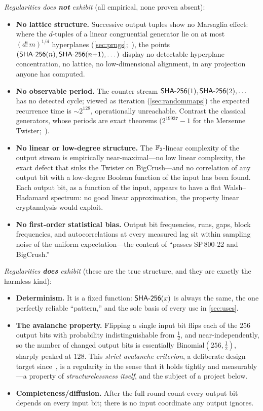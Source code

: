 \emph{Regularities \SHA{} does \textbf{not} exhibit} (all empirical, none
proven absent):
\begin{itemize}
  \item \textbf{No lattice structure.} Successive output tuples show no
  Marsaglia effect: where the $d$-tuples of a linear congruential
  generator lie on at most $(d!\,m)^{1/d}$ hyperplanes
  (\cref{sec:prngs};~\citealp{Marsaglia1968}), the points
  $(\textsf{SHA-256}(n), \textsf{SHA-256}(n{+}1), \dots)$ display no detectable hyperplane
  concentration, no lattice, no low-dimensional alignment, in any
  projection anyone has computed.
  \item \textbf{No observable period.} The counter stream $\textsf{SHA-256}(1),
  \textsf{SHA-256}(2), \dots$ has no detected cycle; viewed as iteration
  (\cref{sec:randommaps}) the expected recurrence time is $\sim 2^{128}$,
  operationally unreachable. Contrast the classical generators, whose
  periods are exact theorems ($2^{19937}-1$ for the Mersenne
  Twister;~\citealp{MatsumotoNishimura1998}).
  \item \textbf{No linear or low-degree structure.} The $\mathbb{F}_2$-linear
  complexity of the output stream is empirically near-maximal---no low
  linear complexity, the exact defect that sinks the Twister on
  BigCrush---and no correlation of any output bit with a
  low-degree Boolean function of the input has been found. Each output
  bit, as a function of the input, appears to have a flat
  Walsh--Hadamard spectrum: no good linear approximation, the property
  linear cryptanalysis would exploit.
  \item \textbf{No first-order statistical bias.} Output bit frequencies,
  runs, gaps, block frequencies, and autocorrelations at every measured
  lag sit within sampling noise of the uniform expectation---the content
  of ``passes SP\,800-22 and BigCrush.''
\end{itemize}

\emph{Regularities \SHA{} \textbf{does} exhibit} (these are the true
structure, and they are exactly the harmless kind):
\begin{itemize}
  \item \textbf{Determinism.} It is a fixed function: $\textsf{SHA-256}(x)$ is always
  the same, the one perfectly reliable ``pattern,'' and the sole basis of
  every use in \cref{sec:uses}.
  \item \textbf{The avalanche property.} Flipping a single input bit
  flips each of the $256$ output bits with probability indistinguishable
  from $\tfrac12$, and near-independently, so the number of changed
  output bits is essentially $\mathrm{Binomial}(256, \tfrac12)$, sharply
  peaked at $128$. This \emph{strict avalanche criterion}, a deliberate
  design target since~\citet{WebsterTavares1985}, is a regularity in the
  sense that it holds tightly and measurably---a property of
  \emph{structurelessness itself}, and the subject of a project below.
  \item \textbf{Completeness/diffusion.} After the full round count every
  output bit depends on every input bit; there is no input coordinate any
  output ignores.
\end{itemize}

